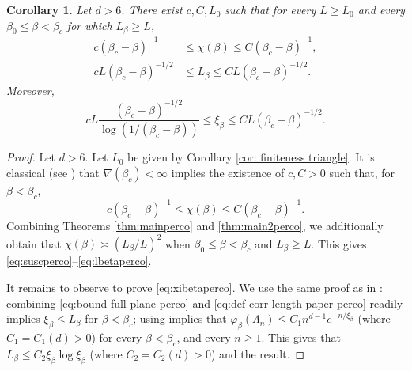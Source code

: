 \documentclass[11pt,a4paper]{article}
\numberwithin{equation}{section}
\theoremstyle{plain}
\newtheorem{Cor}[Thm]{Corollary}
\theoremstyle{definition}
\begin{document}
\begin{Cor}\label{coro: perco susc corr length} Let $d>6$. There exist $c,C,L_0$ such that for every $L\geq L_0$ and every $\beta_0\leq \beta<\beta_c$ for which $L_\beta\geq L$,
\begin{align}
	c(\beta_c-\beta)^{-1}&\leq\chi(\beta)\leq C(\beta_c-\beta)^{-1},\label{eq:suscperco}
	\\cL(\beta_c-\beta)^{-1/2}&\leq L_\beta\leq CL(\beta_c-\beta)^{-1/2}.\label{eq:lbetaperco}
\end{align}
Moreover,
\begin{equation}\label{eq:xibetaperco}
	cL\frac{(\beta_c-\beta)^{-1/2}}{\log(1/(\beta_c-\beta))}\le \xi_\beta\le CL(\beta_c-\beta)^{-1/2}.
\end{equation}
\end{Cor}
\begin{proof} Let $d>6$. Let $L_0$ be given by Corollary \ref{cor: finiteness triangle}. It is classical (see \cite{AizenmanNewmanTreeGraphInequalities1984}) that $\nabla(\beta_c)<\infty$ implies the existence of $c,C>0$ such that, for $\beta<\beta_c$,
\begin{equation}
	c(\beta_c-\beta)^{-1}\leq \chi(\beta)\leq C(\beta_c-\beta)^{-1}.
\end{equation}
Combining Theorems \ref{thm:mainperco} and \ref{thm:main2perco}, we additionally obtain that $\chi(\beta)\asymp (L_\beta/L)^2$ when $\beta_0\leq \beta<\beta_c$ and $L_\beta\geq L$. This gives \eqref{eq:suscperco}--\eqref{eq:lbetaperco}.

It remains to observe to prove \eqref{eq:xibetaperco}. We use the same proof as in \cite[Theorem~1.6]{DuminilPanis2024newLB}: combining \eqref{eq:bound full plane perco} and \eqref{eq:def corr length paper perco} readily implies $\xi_\beta\leq L_\beta$ for $ \beta<\beta_c$; using \cite[Proposition~6.47]{GrimmettPercolation1999} implies that $\varphi_\beta(\Lambda_n)\leq C_1 n^{d-1}e^{-n/\xi_\beta}$ (where $C_1=C_1(d)>0$) for every $\beta<\beta_c$, and every $n\geq 1$. This gives that $L_\beta\leq C_2 \xi_\beta \log \xi_\beta$ (where $C_2=C_2(d)>0$) and the result.
\end{proof}



\end{document}
